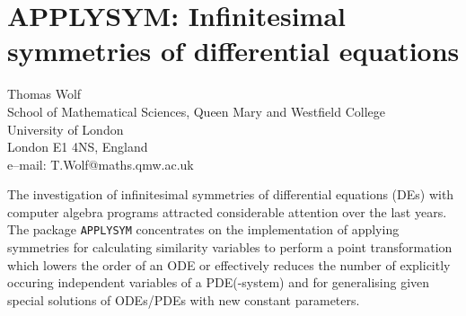 \chapter[APPLYSYM: Infinitesimal symmetries]{APPLYSYM: Infinitesimal symmetries of differential equations}
\label{APPLYSYM}

{\footnotesize
\begin{center}
Thomas Wolf \\
School of Mathematical Sciences, Queen Mary and Westfield College \\
University of London \\
London E1 4NS, England \\[0.05in]
e--mail: T.Wolf@maths.qmw.ac.uk
\end{center}
}

The investigation of infinitesimal symmetries of differential equations
(DEs) with computer algebra programs attracted considerable attention
over the last years.  The package {\tt APPLYSYM} concentrates on the
implementation of applying symmetries for calculating similarity
variables to perform a point transformation which lowers the order of
an ODE or effectively reduces the number of explicitly occuring
independent variables of a PDE(-system) and for generalising given
special solutions of ODEs/PDEs with new constant parameters.


